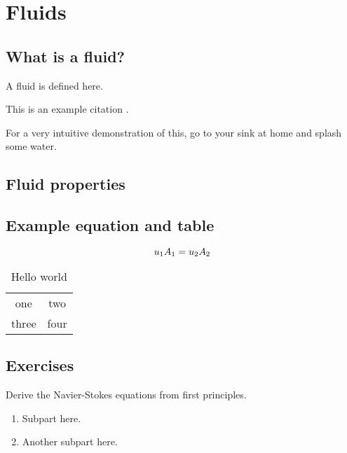 
\chapter{Fluids}
\label{ch:fluids}


\section{What is a fluid?}

\begin{defn}
A fluid is defined here.
\end{defn}

This is an example citation \cite{Janeway:2392, Evangelista:2010}.

\begin{demo} 
For a very intuitive demonstration of this, go to your sink at home and splash some water.
\end{demo}


\section{Fluid properties}

\section{Example equation and table}

\begin{equation}
u_1 A_1 = u_2 A_2
\label{eq:continuity}
\index{equation!continuity}
\end{equation}

\begin{table}
\caption{Hello world}
\begin{center}
\begin{tabular}{cc}
one & two \\
three & four \\
\end{tabular}
\end{center}
\end{table}

\section*{Exercises}
\begin{exercise} 
Derive the Navier-Stokes equations from first principles.
\begin{enumerate}
\item Subpart here.
\item Another subpart here.
\end{enumerate}
\end{exercise}



